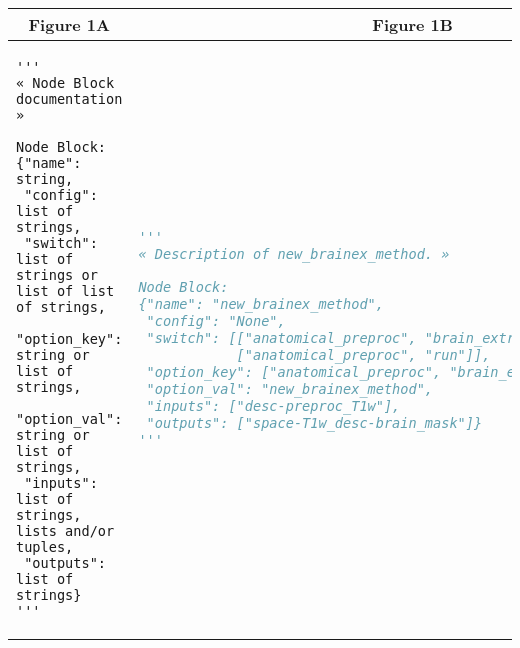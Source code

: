 \documentclass[varwidth=\maxdimen]{standalone}
\begin{document}
  \begin{tabular}[t]{ @{}l|l }
    \multicolumn{1}{c}{Figure 1A} & \multicolumn{1}{c}{Figure 1B} \\
    \hline
    \begin{lstlisting}
'''
« Node Block documentation »

Node Block:
{"name": string,
 "config": list of strings,
 "switch": list of strings or list of list of strings,
 "option_key": string or list of strings,
 "option_val": string or list of strings,
 "inputs": list of strings, lists and/or tuples,
 "outputs": list of strings}
'''\end{lstlisting} & \begin{lstlisting}[language=Python]
'''
« Description of new_brainex_method. »

Node Block:
{"name": "new_brainex_method",
 "config": "None",
 "switch": [["anatomical_preproc", "brain_extraction", "run"],
            ["anatomical_preproc", "run"]],
 "option_key": ["anatomical_preproc", "brain_extraction", "using"],
 "option_val": "new_brainex_method",
 "inputs": ["desc-preproc_T1w"],
 "outputs": ["space-T1w_desc-brain_mask"]}
'''\end{lstlisting} \\
  \end{tabular}
\end{document}
